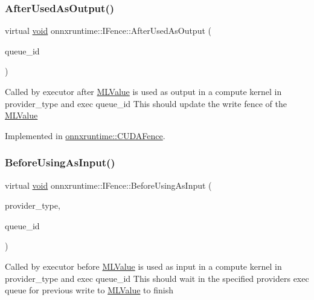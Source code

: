 \subsubsection{\texorpdfstring{After\+Used\+As\+Output()}{AfterUsedAsOutput()}}
{\footnotesize\ttfamily virtual \mbox{\hyperlink{mlasi_8h_a88f941d423cb2a819b70a1358982b1a6}{void}} onnxruntime\+::\+I\+Fence\+::\+After\+Used\+As\+Output (\begin{DoxyParamCaption}\item[{int}]{queue\+\_\+id }\end{DoxyParamCaption})\hspace{0.3cm}{\ttfamily [pure virtual]}}

Called by executor after \mbox{\hyperlink{classonnxruntime_1_1MLValue}{M\+L\+Value}} is used as output in a compute kernel in provider\+\_\+type and exec queue\+\_\+id This should update the write fence of the \mbox{\hyperlink{classonnxruntime_1_1MLValue}{M\+L\+Value}} 

Implemented in \mbox{\hyperlink{classonnxruntime_1_1CUDAFence_aa28331c001ce365edb1aca7e8c801c3f}{onnxruntime\+::\+C\+U\+D\+A\+Fence}}.

\mbox{\label{classonnxruntime_1_1IFence_aff95503bc94e36334887b7c8dbc1d14c}} 
\subsubsection{\texorpdfstring{Before\+Using\+As\+Input()}{BeforeUsingAsInput()}}
{\footnotesize\ttfamily virtual \mbox{\hyperlink{mlasi_8h_a88f941d423cb2a819b70a1358982b1a6}{void}} onnxruntime\+::\+I\+Fence\+::\+Before\+Using\+As\+Input (\begin{DoxyParamCaption}\item[{\mbox{\hyperlink{namespaceonnxruntime_a863e2227cbf32aab76aad35fdadff4bb}{onnxruntime\+::\+Provider\+Type}}}]{provider\+\_\+type,  }\item[{int}]{queue\+\_\+id }\end{DoxyParamCaption})\hspace{0.3cm}{\ttfamily [pure virtual]}}

Called by executor before \mbox{\hyperlink{classonnxruntime_1_1MLValue}{M\+L\+Value}} is used as input in a compute kernel in provider\+\_\+type and exec queue\+\_\+id This should wait in the specified provider\textquotesingle{}s exec queue for previous write to \mbox{\hyperlink{classonnxruntime_1_1MLValue}{M\+L\+Value}} to finish 

